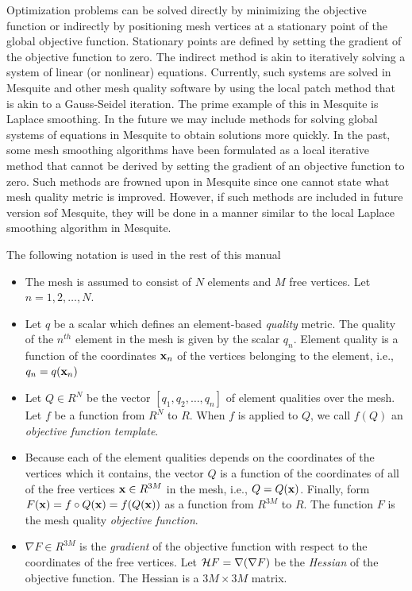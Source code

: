 \documentclass[letter]{report}
\begin{document}
Optimization problems can be solved directly by minimizing the objective 
function or indirectly by positioning mesh vertices at a stationary point
of the global objective function. Stationary points are defined by setting 
the gradient of the objective function to zero. The indirect method is akin 
to iteratively solving a system of linear (or nonlinear) equations. 
Currently, such systems are solved in Mesquite and other mesh quality 
software by using the local patch method that is akin 
to a Gauss-Seidel iteration. The prime example of this in Mesquite is 
Laplace smoothing. In the 
future we may include methods for solving global systems of equations 
in Mesquite to obtain solutions more quickly. 
In the past, some mesh smoothing algorithms have been formulated as a 
local iterative method that cannot be derived  
by setting the gradient of an objective function to zero. Such methods are
frowned upon in Mesquite since one cannot state what mesh quality metric is
improved.  However, if such methods are included in future version sof Mesquite, they will be done in a manner similar to the local Laplace smoothing 
algorithm in Mesquite. \newline

\noindent The following notation is used in the rest of this manual
\begin{itemize}
\item The mesh is assumed to consist of $N$ elements and $M$ free vertices.  
Let $n=1,2,\ldots,N$.
\item Let $q$ be a scalar which defines an element-based {\it quality} metric. 
The quality of the $n^{th}$ element in the mesh is given by the scalar 
$q_n$. Element quality is a function of the coordinates ${\bf x}_n$ 
of the vertices belonging to the element, i.e., $q_n = q({\bf x}_n)$
\item Let $Q \in R^N$ be the vector $[q_1,q_2,\ldots,q_n]$ of element 
qualities over the mesh. Let $f$ be a function from $R^N$ to $R$. When  
$f$ is applied to $Q$, we call $f(Q)$ an {\it objective function template}.
\item Because each of the element qualities depends on the coordinates of
the vertices which it contains, the vector $Q$ is a function of the coordinates
of all of the free vertices ${\bf x} \in R^{3M}$ in the mesh, i.e., $Q=Q({\bf x})$. Finally, form $F({\bf x})= f \circ Q({\bf x}) = f(Q({\bf x}))$ as a 
function from $R^{3M}$ to $R$.  The function $F$ is the mesh quality 
{\it objective function}. 
\item $\nabla F \in R^{3M}$ is the {\it gradient} of the objective function 
with respect to the coordinates of the free vertices. Let ${\cal H} F= \nabla (\nabla F)$ be the {\it Hessian} of the objective function.  The Hessian is a 
$3M \times 3M$ matrix. 
\end{itemize}
\end{document}
